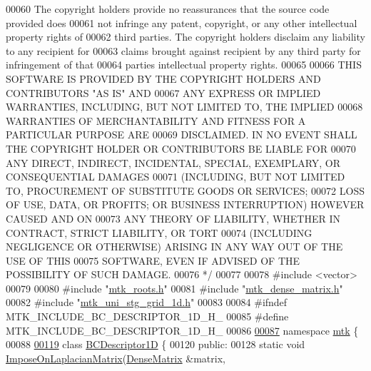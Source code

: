 \begin{DoxyCode}
00060 \textcolor{comment}{The copyright holders provide no reassurances that the source code provided does}
00061 \textcolor{comment}{not infringe any patent, copyright, or any other intellectual property rights of}
00062 \textcolor{comment}{third parties. The copyright holders disclaim any liability to any recipient for}
00063 \textcolor{comment}{claims brought against recipient by any third party for infringement of that}
00064 \textcolor{comment}{parties intellectual property rights.}
00065 \textcolor{comment}{}
00066 \textcolor{comment}{THIS SOFTWARE IS PROVIDED BY THE COPYRIGHT HOLDERS AND CONTRIBUTORS "AS IS" AND}
00067 \textcolor{comment}{ANY EXPRESS OR IMPLIED WARRANTIES, INCLUDING, BUT NOT LIMITED TO, THE IMPLIED}
00068 \textcolor{comment}{WARRANTIES OF MERCHANTABILITY AND FITNESS FOR A PARTICULAR PURPOSE ARE}
00069 \textcolor{comment}{DISCLAIMED. IN NO EVENT SHALL THE COPYRIGHT HOLDER OR CONTRIBUTORS BE LIABLE FOR}
00070 \textcolor{comment}{ANY DIRECT, INDIRECT, INCIDENTAL, SPECIAL, EXEMPLARY, OR CONSEQUENTIAL DAMAGES}
00071 \textcolor{comment}{(INCLUDING, BUT NOT LIMITED TO, PROCUREMENT OF SUBSTITUTE GOODS OR SERVICES;}
00072 \textcolor{comment}{LOSS OF USE, DATA, OR PROFITS; OR BUSINESS INTERRUPTION) HOWEVER CAUSED AND ON}
00073 \textcolor{comment}{ANY THEORY OF LIABILITY, WHETHER IN CONTRACT, STRICT LIABILITY, OR TORT}
00074 \textcolor{comment}{(INCLUDING NEGLIGENCE OR OTHERWISE) ARISING IN ANY WAY OUT OF THE USE OF THIS}
00075 \textcolor{comment}{SOFTWARE, EVEN IF ADVISED OF THE POSSIBILITY OF SUCH DAMAGE.}
00076 \textcolor{comment}{*/}
00077 
00078 \textcolor{preprocessor}{#include <vector>}
00079 
00080 \textcolor{preprocessor}{#include "\hyperlink{mtk__roots_8h}{mtk\_roots.h}"}
00081 \textcolor{preprocessor}{#include "\hyperlink{mtk__dense__matrix_8h}{mtk\_dense\_matrix.h}"}
00082 \textcolor{preprocessor}{#include "\hyperlink{mtk__uni__stg__grid__1d_8h}{mtk\_uni\_stg\_grid\_1d.h}"}
00083 
00084 \textcolor{preprocessor}{#ifndef MTK\_INCLUDE\_BC\_DESCRIPTOR\_1D\_H\_}
00085 \textcolor{preprocessor}{#define MTK\_INCLUDE\_BC\_DESCRIPTOR\_1D\_H\_}
00086 
\hypertarget{mtk__bc__descriptor__1d_8h_source_l00087}{}\hyperlink{namespacemtk}{00087} \textcolor{keyword}{namespace }\hyperlink{namespacemtk}{mtk} \{
00088 
\hypertarget{mtk__bc__descriptor__1d_8h_source_l00119}{}\hyperlink{classmtk_1_1BCDescriptor1D}{00119} \textcolor{keyword}{class }\hyperlink{classmtk_1_1BCDescriptor1D}{BCDescriptor1D} \{
00120  \textcolor{keyword}{public}:
00128   \textcolor{keyword}{static} \textcolor{keywordtype}{void} \hyperlink{classmtk_1_1BCDescriptor1D_a33e51235eaa930e4470f027001a023cf}{ImposeOnLaplacianMatrix}(\hyperlink{classmtk_1_1DenseMatrix}{DenseMatrix} &matrix,

\end{DoxyCode}
